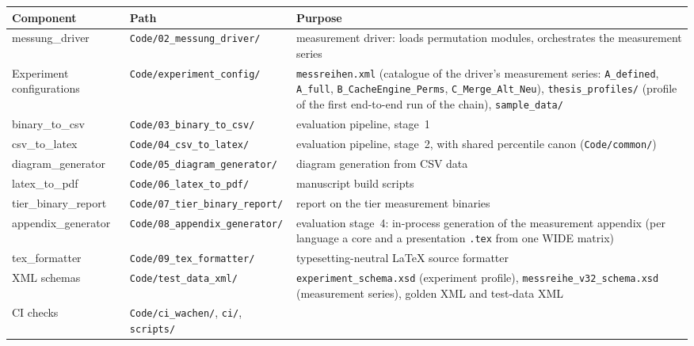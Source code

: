{\small
\begin{longtable}{@{}>{\raggedright\arraybackslash}p{}>{\raggedright\arraybackslash}p{}>{\raggedright\arraybackslash}p{}@{}}
\toprule
\textbf{Component} & \textbf{Path} & \textbf{Purpose} \\
\midrule
\endhead%
\midrule
\endfoot%
\bottomrule
\endlastfoot%
messung\_driver &
\texttt{Code/\allowbreak{}02\_messung\_driver/} &
measurement driver: loads permutation modules, orchestrates the measurement series \\
Experiment configurations &
\texttt{Code/\allowbreak{}experiment\_config/} &
\texttt{messreihen.xml} (catalogue of the driver's measurement series: \texttt{A\_defined}, \texttt{A\_full},
\texttt{B\_\allowbreak{}CacheEngine\_\allowbreak{}Perms}, \texttt{C\_\allowbreak{}Merge\_\allowbreak{}Alt\_\allowbreak{}Neu}),
\texttt{thesis\_\allowbreak{}profiles/} (profile of the first end-to-end run of the chain), \texttt{sample\_\allowbreak{}data/} \\
binary\_to\_csv &
\texttt{Code/\allowbreak{}03\_binary\_to\_csv/} &
evaluation pipeline, stage~1 \\
csv\_to\_latex &
\texttt{Code/\allowbreak{}04\_csv\_to\_latex/} &
evaluation pipeline, stage~2, with shared percentile canon (\texttt{Code/\allowbreak{}common/}) \\
diagram\_generator &
\texttt{Code/\allowbreak{}05\_diagram\_generator/} &
diagram generation from CSV data \\
latex\_to\_pdf &
\texttt{Code/\allowbreak{}06\_latex\_to\_pdf/} &
manuscript build scripts \\
tier\_binary\_report &
\texttt{Code/\allowbreak{}07\_tier\_binary\_report/} &
report on the tier measurement binaries \\
appendix\_generator &
\texttt{Code/\allowbreak{}08\_appendix\_generator/} &
evaluation stage~4: in-process generation of the measurement appendix (per language a core and a
presentation \texttt{.tex} from one WIDE matrix) \\
tex\_formatter &
\texttt{Code/\allowbreak{}09\_tex\_formatter/} &
typesetting-neutral LaTeX source formatter \\
XML schemas &
\texttt{Code/\allowbreak{}test\_data\_xml/} &
\texttt{experiment\_\allowbreak{}schema.xsd} (experiment profile), \texttt{messreihe\_\allowbreak{}v32\_\allowbreak{}schema.xsd}
(measurement series), golden XML and test-data XML \\
CI checks &
\texttt{Code/\allowbreak{}ci\_wachen/}, \texttt{ci/}, \texttt{scripts/} &

\end{longtable}}
